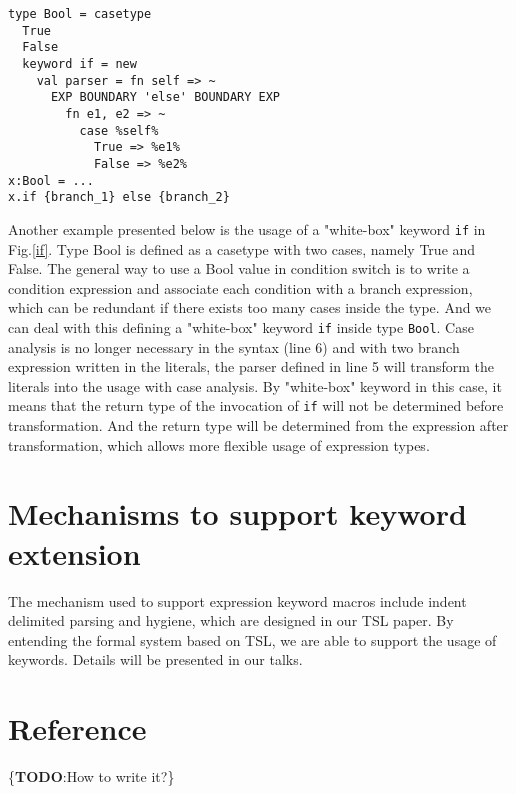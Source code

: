 \documentclass[letterpaper, notitlepage]{article}
\begin{document}
\begin{figure*}[htb!]
\begin{center}
\begin{lstlisting}[style=wyvern]
type Bool = casetype
  True
  False
  keyword if = new
    val parser = fn self => ~
      EXP BOUNDARY 'else' BOUNDARY EXP
        fn e1, e2 => ~
          case %self%
            True => %e1%
            False => %e2%
x:Bool = ...
x.if {branch_1} else {branch_2}
\end{lstlisting}
\end{center}
\caption{``White-box'' keyword \texttt{if} defined as a member of  type \texttt{Bool}}
\label{if}
\end{figure*}
\par

Another example presented below is the usage of a "white-box" keyword \texttt{if} in Fig.\ref{if}. Type Bool is defined as a casetype with two cases, namely True and False. The general way to use a Bool value in condition switch is to write a condition expression and associate each condition with a branch expression, which can be redundant if there exists too many cases inside the type. And we can deal with this defining a "white-box" keyword \texttt{if} inside type \texttt{Bool}. Case analysis is no longer necessary in the syntax (line 6) and with two branch expression written in the literals, the parser defined in line 5 will transform the literals into the usage with case analysis. By "white-box" keyword in this case, it means that the return type of the invocation of \texttt{if} will not be determined before transformation. And the return type will be determined from the expression after transformation, which allows more flexible usage of expression types.

\section{Mechanisms to support keyword extension}
The mechanism used to support expression keyword macros include indent delimited parsing and hygiene, which are designed in our TSL paper. By entending the formal system based on TSL, we are able to support the usage of keywords. Details will be presented in our talks.

\section{Reference}
\{\textbf{TODO}:How to write it?\}
\end{document}
